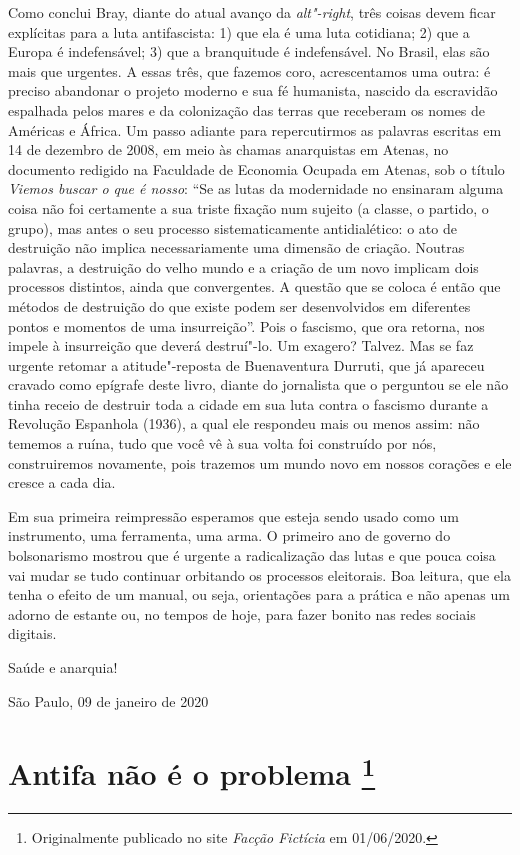 Como conclui Bray, diante do atual avanço da \emph{alt"-right}, três
coisas devem ficar explícitas para a luta antifascista: 1) que ela é uma
luta cotidiana; 2) que a Europa é indefensável; 3) que a branquitude é
indefensável. No Brasil, elas são mais que urgentes. A essas três, que
fazemos coro, acrescentamos uma outra: é preciso abandonar o projeto
moderno e sua fé humanista, nascido da escravidão espalhada pelos mares
e da colonização das terras que receberam os nomes de Américas e África.
Um passo adiante para repercutirmos as palavras escritas em 14 de
dezembro de 2008, em meio às chamas anarquistas em Atenas, no documento
redigido na Faculdade de Economia Ocupada em Atenas, sob o título
\emph{Viemos buscar o que é nosso}: ``Se as lutas da modernidade no
ensinaram alguma coisa não foi certamente a sua triste fixação num
sujeito (a classe, o partido, o grupo), mas antes o seu processo
sistematicamente antidialético: o ato de destruição não implica
necessariamente uma dimensão de criação. Noutras palavras, a destruição
do velho mundo e a criação de um novo implicam dois processos distintos,
ainda que convergentes. A questão que se coloca é então que métodos de
destruição do que existe podem ser desenvolvidos em diferentes pontos e
momentos de uma insurreição''. Pois o fascismo, que ora retorna, nos
impele à insurreição que deverá destruí"-lo. Um exagero? Talvez. Mas se
faz urgente retomar a atitude"-reposta de Buenaventura Durruti, que já
apareceu cravado como epígrafe deste livro, diante do jornalista que o
perguntou se ele não tinha receio de destruir toda a cidade em sua luta
contra o fascismo durante a Revolução Espanhola (1936), a qual ele
respondeu mais ou menos assim: não tememos a ruína, tudo que você vê à
sua volta foi construído por nós, construiremos novamente, pois trazemos
um mundo novo em nossos corações e ele cresce a cada dia.

Em sua primeira reimpressão esperamos que esteja sendo usado como um
instrumento, uma ferramenta, uma arma. O primeiro ano de governo do
bolsonarismo mostrou que é urgente a radicalização das lutas e que pouca
coisa vai mudar se tudo continuar orbitando os processos eleitorais.
Boa leitura, que ela tenha o efeito de um manual, ou seja, orientações
para a prática e não apenas um adorno de estante ou, no tempos de hoje,
para fazer bonito nas redes sociais digitais.

Saúde e anarquia!

\bigskip\hfill{}São Paulo, 09 de janeiro de 2020

\chapter*{Antifa não é o problema \footnote[*]{Originalmente publicado no site \emph{Facção Fictícia} em 01/06/2020.}}


